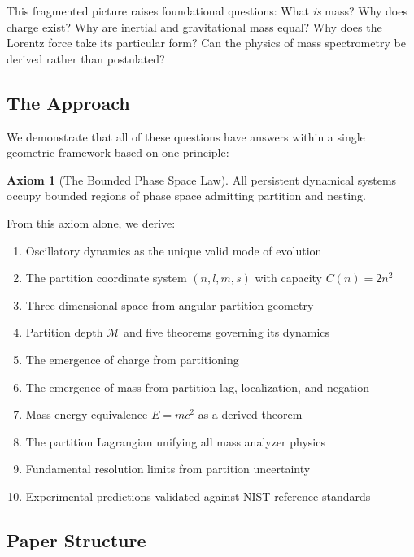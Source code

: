 \documentclass[twocolumn,10pt,a4paper]{article}
\theoremstyle{definition}
\newtheorem{axiom}{Axiom}
\theoremstyle{remark}
\newcommand{\Depth}{\mathcal{M}}
\begin{document}
This fragmented picture raises foundational questions: What \emph{is} mass? Why does charge exist? Why are inertial and gravitational mass equal? Why does the Lorentz force take its particular form? Can the physics of mass spectrometry be derived rather than postulated?

\subsection{The Approach}

We demonstrate that all of these questions have answers within a single geometric framework based on one principle:

\begin{axiom}[The Bounded Phase Space Law]
\label{ax:bpsl}
All persistent dynamical systems occupy bounded regions of phase space admitting partition and nesting.
\end{axiom}

From this axiom alone, we derive:
\begin{enumerate}[label=(\roman*)]
    \item Oscillatory dynamics as the unique valid mode of evolution
    \item The partition coordinate system $(n, l, m, s)$ with capacity $C(n) = 2n^2$
    \item Three-dimensional space from angular partition geometry
    \item Partition depth $\Depth$ and five theorems governing its dynamics
    \item The emergence of charge from partitioning
    \item The emergence of mass from partition lag, localization, and negation
    \item Mass-energy equivalence $E = mc^2$ as a derived theorem
    \item The partition Lagrangian unifying all mass analyzer physics
    \item Fundamental resolution limits from partition uncertainty
    \item Experimental predictions validated against NIST reference standards
\end{enumerate}

\subsection{Paper Structure}
\end{document}
